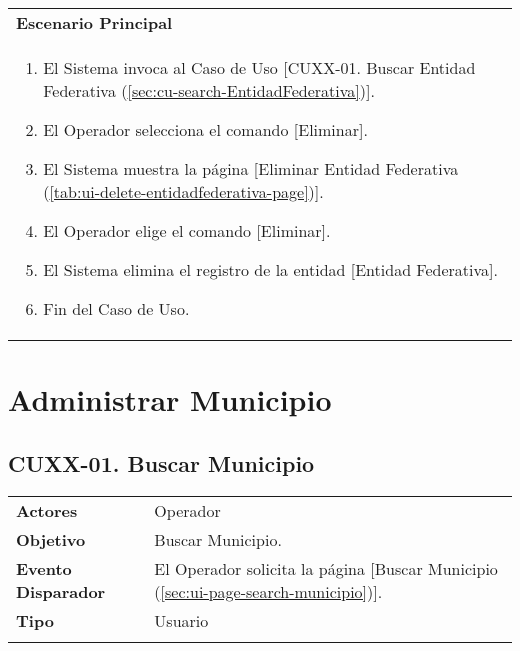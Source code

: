 \begin{tabular}{ p{15.5cm} }
	\textbf{Escenario Principal} \\
	\begin{enumerate}
		\item El Sistema invoca al Caso de Uso [CUXX-01. Buscar Entidad Federativa (\ref{sec:cu-search-EntidadFederativa})].
		\item El Operador selecciona el comando [Eliminar].
		\item El Sistema muestra la página [Eliminar Entidad Federativa (\ref{tab:ui-delete-entidadfederativa-page})].
		\item El Operador elige el comando [Eliminar].
		\item El Sistema elimina el registro de la entidad [Entidad Federativa].
		\item Fin del Caso de Uso.
	\end{enumerate}
\end{tabular}

\clearpage
\section{Administrar Municipio} \label{sec:cf-uc-admin-municipio}

\subsection{CUXX-01. Buscar Municipio} \label{sec:cu-search-Municipio}

\begin{tabular}{ p{3.5cm} p{11.5cm} }
	\textbf{Actores} & Operador\\
	\textbf{Objetivo} & Buscar Municipio.\\
	\textbf{Evento Disparador} & El Operador solicita la página [Buscar Municipio (\ref{sec:ui-page-search-municipio})].\\
	\textbf{Tipo} & Usuario\\
	\\
\end{tabular}

